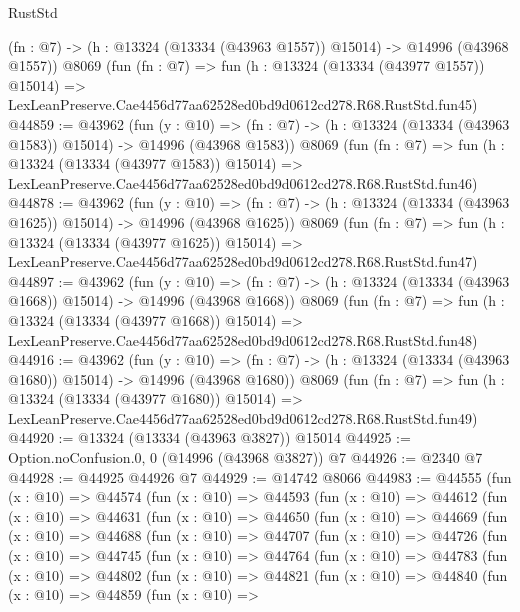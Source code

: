 \begin{lexlean}{RustStd}
\begin{coremodule}
    (fn : @7) -> (h : @13324 (@13334 (@43963 @1557)) @15014) -> @14996 (@43968 @1557))
    @8069
    (fun (fn : @7) =>
    fun (h : @13324 (@13334 (@43977 @1557)) @15014) =>
    LexLeanPreserve.Cae4456d77aa62528ed0bd9d0612cd278.R68.RustStd.fun45)
@44859 := @43962
    (fun (y : @10) =>
    (fn : @7) -> (h : @13324 (@13334 (@43963 @1583)) @15014) -> @14996 (@43968 @1583))
    @8069
    (fun (fn : @7) =>
    fun (h : @13324 (@13334 (@43977 @1583)) @15014) =>
    LexLeanPreserve.Cae4456d77aa62528ed0bd9d0612cd278.R68.RustStd.fun46)
@44878 := @43962
    (fun (y : @10) =>
    (fn : @7) -> (h : @13324 (@13334 (@43963 @1625)) @15014) -> @14996 (@43968 @1625))
    @8069
    (fun (fn : @7) =>
    fun (h : @13324 (@13334 (@43977 @1625)) @15014) =>
    LexLeanPreserve.Cae4456d77aa62528ed0bd9d0612cd278.R68.RustStd.fun47)
@44897 := @43962
    (fun (y : @10) =>
    (fn : @7) -> (h : @13324 (@13334 (@43963 @1668)) @15014) -> @14996 (@43968 @1668))
    @8069
    (fun (fn : @7) =>
    fun (h : @13324 (@13334 (@43977 @1668)) @15014) =>
    LexLeanPreserve.Cae4456d77aa62528ed0bd9d0612cd278.R68.RustStd.fun48)
@44916 := @43962
    (fun (y : @10) =>
    (fn : @7) -> (h : @13324 (@13334 (@43963 @1680)) @15014) -> @14996 (@43968 @1680))
    @8069
    (fun (fn : @7) =>
    fun (h : @13324 (@13334 (@43977 @1680)) @15014) =>
    LexLeanPreserve.Cae4456d77aa62528ed0bd9d0612cd278.R68.RustStd.fun49)
@44920 := @13324 (@13334 (@43963 @3827)) @15014
@44925 := Option.noConfusion.{0, 0} (@14996 (@43968 @3827)) @7
@44926 := @2340 @7
@44928 := @44925 @44926 @7
@44929 := @14742 @8066
@44983 := @44555
    (fun (x : @10) =>
    @44574
      (fun (x : @10) =>
      @44593
        (fun (x : @10) =>
        @44612
          (fun (x : @10) =>
          @44631
            (fun (x : @10) =>
            @44650
              (fun (x : @10) =>
              @44669
                (fun (x : @10) =>
                @44688
                  (fun (x : @10) =>
                  @44707
                    (fun (x : @10) =>
                    @44726
                      (fun (x : @10) =>
                      @44745
                        (fun (x : @10) =>
                        @44764
                          (fun (x : @10) =>
                          @44783
                            (fun (x : @10) =>
                            @44802
                              (fun (x : @10) =>
                              @44821
                                (fun (x : @10) =>
                                @44840
                                  (fun (x : @10) =>
                                  @44859
                                    (fun (x : @10) =>

\end{coremodule}
\end{lexlean}
